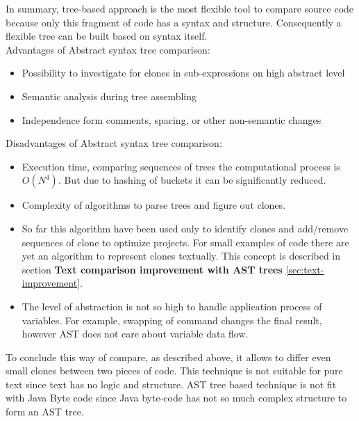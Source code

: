 \documentclass{report}
\begin{document}
In summary, tree-based approach is the most flexible tool to compare source code because only this fragment of code has a syntax and structure. Consequently a flexible tree can be built based on syntax itself. \\
Advantages of Abstract syntax tree comparison:
\begin{itemize}
	\item Possibility to investigate for clones in sub-expressions on high abstract level
	\item Semantic analysis during tree assembling 
	\item Independence form comments, spacing, or other non-semantic changes
\end{itemize}
Disadvantages of Abstract syntax tree comparison:
\begin{itemize}
	\item Execution time, comparing sequences of trees the computational process is $O(N^4)$. But due to hashing of buckets it can be significantly reduced.
	\item Complexity of algorithms to parse trees and figure out clones.
	\item So far this algorithm have been used only to identify clones and add/remove sequences of clone to optimize projects. For small examples of code there are yet an algorithm to represent clones textually. This concept is described in section \textbf{Text comparison improvement with AST trees} \ref{sec:text-improvement}.
	\item The level of abstraction is not so high to handle application process of variables. For example, swapping of command changes the final result, however AST does not care about variable data flow.
\end{itemize}
To conclude this way of compare, as described above, it allows to differ even small clones between two pieces of code. This technique is not suitable for pure text since text has no logic and structure. AST tree based technique is not fit with Java Byte code since Java byte-code has not so much complex structure to form an AST tree. 
\end{document}
